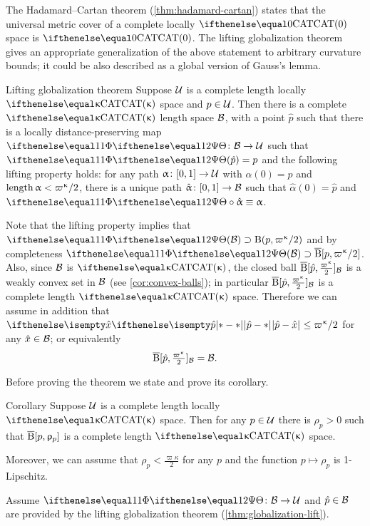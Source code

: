 The Hadamard--Cartan theorem (\ref{thm:hadamard-cartan}) states that 
the universal metric cover of a complete locally $\CAT0$ space is $\CAT0$.
The lifting globalization theorem gives an appropriate generalization of the above statement to arbitrary curvature bounds;
it could be also described as a global version of Gauss's lemma.



\begin{thm}{Lifting globalization theorem}
\label{thm:globalization-lift}
Suppose $\mathcal{U}$ is a complete length locally $\CAT\kappa$ space and  $p\in\spc{U}$.
Then there is a complete $\CAT\kappa$ length space $\mathcal{B}$, 
with a point $\hat p$ such that 
there is a locally distance-preserving map $\map\:\spc{B}\to\spc{U}$
such that $\map(\hat p)=p$ and the following lifting property holds: 
for any path $\alpha\:[0,1]\to\spc{U}$ with $\alpha(0)=p$ and $\length\alpha<\varpi\kappa/2$, 
there is a unique path $\hat\alpha \:[0,1]\to \spc{B}$ such that $\hat\alpha(0)=\hat p$ 
and $\map\circ\hat\alpha\equiv\alpha$.
\end{thm}


Note that the lifting property implies that $\map(\spc{B})\supset\oBall(p,\varpi\kappa/2)$ and by completeness $\map(\spc{B})\supset\cBall[p,\varpi\kappa/2]$.
Also, since $\mathcal{B}$ is $\CAT\kappa$, the closed ball $\cBall[\hat p,\tfrac{\varpi\kappa}2]_{\spc{B}}$ is a weakly convex set in $\mathcal{B}$ (see \ref{cor:convex-balls});
in particular $\cBall[\hat p,\tfrac{\varpi\kappa}2]_{\spc{B}}$ is a complete length $\CAT\kappa$ space.
Therefore we can assume in addition that $\dist{\hat p}{\hat x}{}\le \varpi\kappa/2$ for any $\hat x\in\spc{B}$;
or equivalently
\[\cBall[\hat p,\tfrac{\varpi\kappa}2]_{\spc{B}}=\spc{B}.\]


Before proving the theorem we state and prove its corollary.

\begin{thm}{Corollary}\label{cor:loc-CAT(k)}
Suppose $\mathcal{U}$ is a complete length locally $\CAT\kappa$ space.
Then for any $p\in\spc{U}$ there is $\rho_p>0$
such that $\overline{\mathrm{B}}{}[p,\upvarrho_p]$ is a complete length $\CAT\kappa$ space.

Moreover, we can assume that $\rho_p<\tfrac{\varpi\kappa}2$
for any $p$ and the function $p\mapsto\rho_p$ is 1-Lipschitz.
\end{thm}

Assume $\map\:\spc{B}\to \spc{U}$ 
and $\hat p\in \spc{B}$
are provided by the lifting globalization theorem
(\ref{thm:globalization-lift}).

